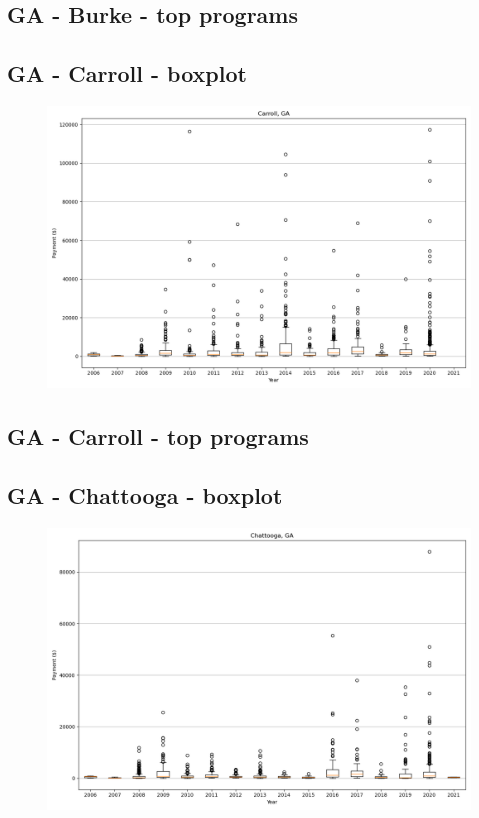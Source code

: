 \subsection*{GA - Burke - top programs}

\newpage
\subsection*{GA - Carroll - boxplot}
\begin{figure}[h]
\centering
\includegraphics[width=7in]{../output/boxplots/counties/Carroll-GA_boxplot.png}
\end{figure}


\subsection*{GA - Carroll - top programs}

\newpage
\subsection*{GA - Chattooga - boxplot}
\begin{figure}[h]
\centering
\includegraphics[width=7in]{../output/boxplots/counties/Chattooga-GA_boxplot.png}
\end{figure}


